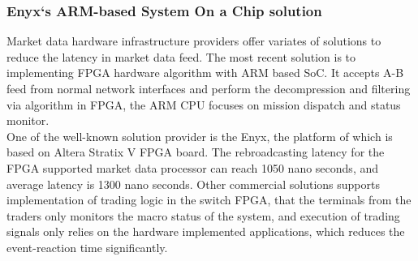 \documentclass[11pt,openright,a4paper]{report}
\begin{document}
\subsubsection{Enyx`s ARM-based System On a Chip solution}
Market data hardware infrastructure providers offer variates of solutions to reduce the latency in market data feed. The most recent solution is to implementing FPGA hardware algorithm with ARM based SoC. It accepts A-B feed from normal network interfaces and perform the decompression and filtering via algorithm in FPGA, the ARM CPU focuses on mission dispatch and status monitor.\\
One of the well-known solution provider is the Enyx, the platform of which is based on Altera Stratix V FPGA board. The rebroadcasting latency for the FPGA supported market data processor can reach 1050 nano seconds, and average latency is 1300 nano seconds\cite{ciscoWhitePaper}. Other commercial solutions supports implementation of trading logic in the switch FPGA, that the terminals from the traders only monitors the macro status of the system, and execution of trading signals only relies on the hardware implemented applications, which reduces the event-reaction time significantly.\\ 
\end{document}
